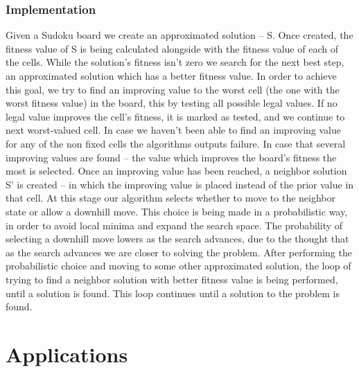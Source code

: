 \documentclass[fleqn,10pt]{SelfArx}
\begin{document}
\subsubsection{Implementation}
Given a Sudoku board we create an approximated solution – S.
Once created, the fitness value of S is being calculated alongside with the fitness value of each of the cells.
While the solution's fitness isn't zero we search for the next best step, an approximated solution which has a better fitness value.
In order to achieve this goal, we try to find an improving value to the worst cell (the one with the worst fitness value) in the board, this by testing all possible legal values.
If no legal value improves the cell's fitness, it is marked as tested, and we continue to next worst-valued cell. In case we haven't been able to find an improving value for any of the non fixed cells the algorithms outputs failure.
In case that several improving values are found – the value which improves the board's fitness the most is selected.
Once an improving value has been reached, a neighbor solution S' is created – in which the improving value is placed instead of the prior value in that cell.
At this stage our algorithm selects whether to move to the neighbor state or allow a downhill move. This choice is being made in a probabilistic way, in order to avoid local minima and expand the search space. The probability of selecting a downhill move lowers as the search advances, due to the thought that as the search advances we are closer to solving the problem.
After performing the probabilistic choice and moving to some other approximated solution, the loop of trying to find a neighbor solution with better fitness value is being performed, until a solution is found.
This loop continues until a solution to the problem is found.






\section{Applications}
\end{document}
